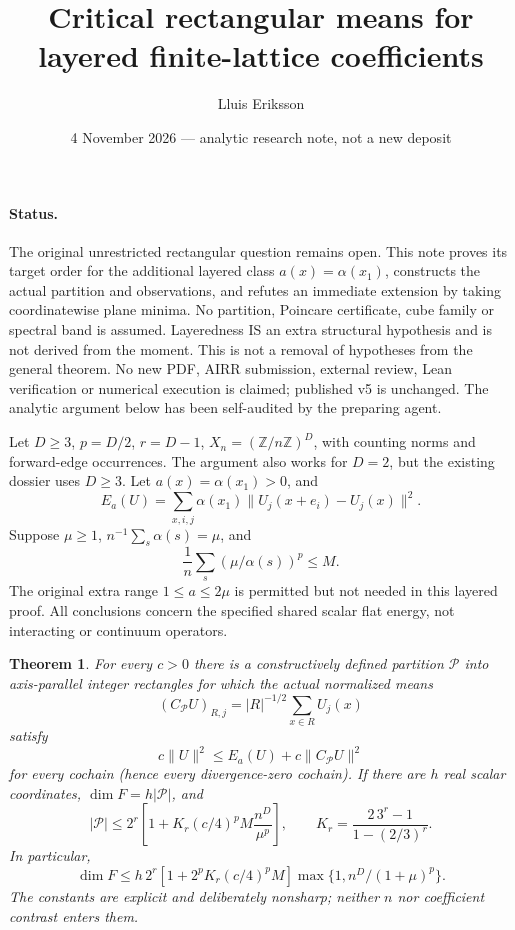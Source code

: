 \documentclass[11pt]{article}
\title{Critical rectangular means for layered finite-lattice coefficients}
\author{Lluis Eriksson}
\date{4 November 2026 --- analytic research note, not a new deposit}
\newtheorem{theorem}{Theorem}
\begin{document}
\maketitle
\paragraph{Status.} The original unrestricted rectangular question remains open. This note proves its target order for the additional layered class $a(x)=\alpha(x_1)$, constructs the actual partition and observations, and refutes an immediate extension by taking coordinatewise plane minima. No partition, Poincare certificate, cube family or spectral band is assumed. Layeredness IS an extra structural hypothesis and is not derived from the moment. This is not a removal of hypotheses from the general theorem. No new PDF, AIRR submission, external review, Lean verification or numerical execution is claimed; published v5 is unchanged. The analytic argument below has been self-audited by the preparing agent.

Let $D\ge3$, $p=D/2$, $r=D-1$, $X_n=(\mathbb Z/n\mathbb Z)^D$, with counting norms and forward-edge occurrences. The argument also works for $D=2$, but the existing dossier uses $D\ge3$. Let $a(x)=\alpha(x_1)>0$, and
\[
 E_a(U)=\sum_{x,i,j}\alpha(x_1)\|U_j(x+e_i)-U_j(x)\|^2.
\]
Suppose $\mu\ge1$, $n^{-1}\sum_s\alpha(s)=\mu$, and
\[
 \frac1n\sum_s(\mu/\alpha(s))^p\le M.
\]
The original extra range $1\le a\le2\mu$ is permitted but not needed in this layered proof. All conclusions concern the specified shared scalar flat energy, not interacting or continuum operators.

\begin{theorem}\label{thm:main}
For every $c>0$ there is a constructively defined partition $\mathcal P$ into axis-parallel integer rectangles for which the actual normalized means
\[
 (C_{\mathcal P}U)_{R,j}=|R|^{-1/2}\sum_{x\in R}U_j(x)
\]
satisfy
\[
 c\|U\|^2\le E_a(U)+c\|C_{\mathcal P}U\|^2
\]
for every cochain (hence every divergence-zero cochain). If there are $h$ real scalar coordinates, $\dim F=h|\mathcal P|$, and
\[
 |\mathcal P|\le 2^r\left[1+K_r(c/4)^p M\frac{n^D}{\mu^p}\right],
 \qquad K_r=\frac{2\,3^r-1}{1-(2/3)^r}.
\]
In particular,
\[
 \dim F\le h\,2^r[1+2^pK_r(c/4)^p M]
 \max\{1,n^D/(1+\mu)^p\}.
\]
The constants are explicit and deliberately nonsharp; neither $n$ nor coefficient contrast enters them.
\end{theorem}
\end{document}
